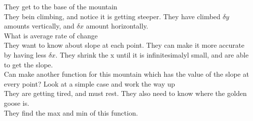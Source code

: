 They get to the base of the mountain \\ 
They bein climbing, and notice it is getting steeper. They have climbed $\delta y$ amounts vertically, and $\delta x $ amount horizontally. \\ 
What is average rate of change \\
They want to know about slope at each point. They can make it more accurate by having less $\delta x$. They shrink the x until it is infinitesimalyl small, and are able to get the slope.\\ 
Can make another function for this mountain which has the value of the slope at every point? Look at a simple case and work the way up \\
They are getting tired, and must rest. They also need to know where the golden goose is. \\
\indent They find the max and min of this function.
\pagebreak